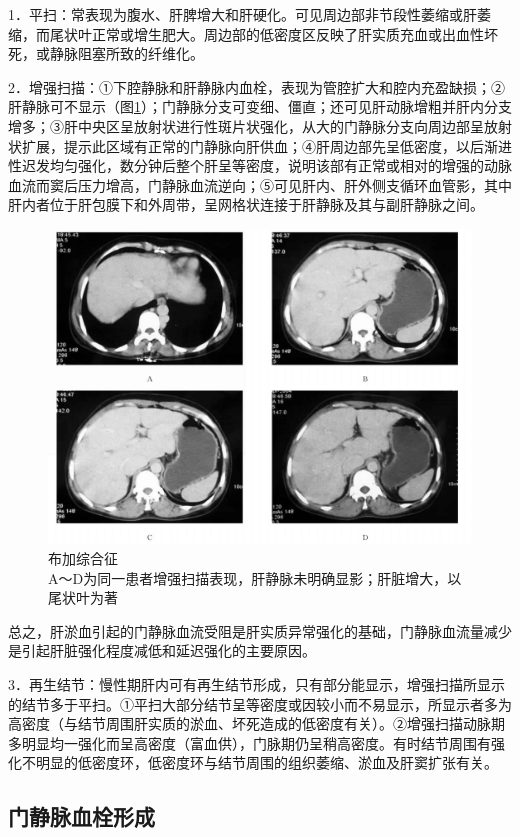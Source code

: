 1．平扫：常表现为腹水、肝脾增大和肝硬化。可见周边部非节段性萎缩或肝萎缩，而尾状叶正常或增生肥大。周边部的低密度区反映了肝实质充血或出血性坏死，或静脉阻塞所致的纤维化。

2．增强扫描：①下腔静脉和肝静脉内血栓，表现为管腔扩大和腔内充盈缺损；②肝静脉可不显示（图\ref{fig11-17}）；门静脉分支可变细、僵直；还可见肝动脉增粗并肝内分支增多；③肝中央区呈放射状进行性斑片状强化，从大的门静脉分支向周边部呈放射状扩展，提示此区域有正常的门静脉向肝供血；④肝周边部先呈低密度，以后渐进性迟发均匀强化，数分钟后整个肝呈等密度，说明该部有正常或相对的增强的动脉血流而窦后压力增高，门静脉血流逆向；⑤可见肝内、肝外侧支循环血管影，其中肝内者位于肝包膜下和外周带，呈网格状连接于肝静脉及其与副肝静脉之间。

\begin{figure}[!htbp]
 \centering
 \includegraphics[width=.7\textwidth,height=\textheight,keepaspectratio]{./images/Image00289.jpg}
 \captionsetup{justification=centering}
 \caption{布加综合征\\{\small A～D为同一患者增强扫描表现，肝静脉未明确显影；肝脏增大，以尾状叶为著}}
 \label{fig11-17}
  \end{figure} 

总之，肝淤血引起的门静脉血流受阻是肝实质异常强化的基础，门静脉血流量减少是引起肝脏强化程度减低和延迟强化的主要原因。

3．再生结节：慢性期肝内可有再生结节形成，只有部分能显示，增强扫描所显示的结节多于平扫。①平扫大部分结节呈等密度或因较小而不易显示，所显示者多为高密度（与结节周围肝实质的淤血、坏死造成的低密度有关）。②增强扫描动脉期多明显均一强化而呈高密度（富血供），门脉期仍呈稍高密度。有时结节周围有强化不明显的低密度环，低密度环与结节周围的组织萎缩、淤血及肝窦扩张有关。

\subsection{门静脉血栓形成}


